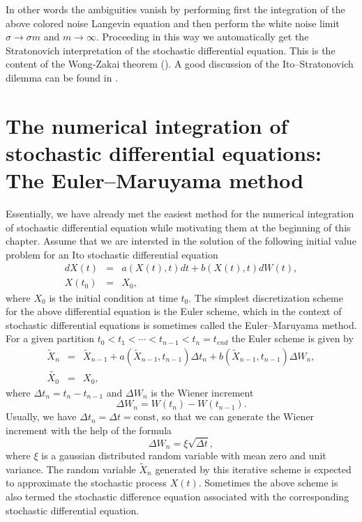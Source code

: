 In other words the ambiguities vanish by performing first the 
integration of the above colored noise Langevin equation and then 
perform the white noise limit $\sigma \rightarrow \sigma m$ and 
$m \rightarrow \infty$. Proceeding in this way we automatically 
get the Stratonovich interpretation of the stochastic differential 
equation. This is the content of the Wong-Zakai theorem 
(\cite{HORSTHEMKE}). A good discussion of the Ito--Stratonovich
dilemma can be found in \cite{VAN_KAMPEN}.



\section{The numerical integration of stochastic differential 
equations: The Euler--Maruyama method}
Essentially, we have already met the easiest method for the 
numerical integration of stochastic differential equation while 
motivating them at the beginning of this chapter.
Assume that we are intersted in the solution of the following
initial value problem for an Ito stochastic differential equation
\begin{eqnarray*}
dX(t) &=& a(X(t),t) dt + b(X(t),t) dW(t), \\
X(t_0) &=& X_0,
\end{eqnarray*}
where $X_0$ is the initial condition at time $t_0$. The simplest 
discretization scheme for the above differential equation
is the Euler scheme, which in the context of stochastic 
differential equations is sometimes called the Euler--Maruyama
method. For a given partition 
$t_0 < t_1 < \cdots < t_{n-1} < t_n=t_{end}$ 
the Euler scheme is given by
\begin{eqnarray*}
\tilde{X}_n &=& \tilde{X}_{n-1} +a (\tilde{X}_{n-1},t_{n-1}) \Delta 
t_n + b(\tilde{X}_{n-1},t_{n-1}) \Delta W_n, \\
\tilde{X_0} &=& X_0,
\end{eqnarray*}
where $\Delta t_n = t_n - t_{n-1}$ and $\Delta W_n$
is the Wiener increment
\begin{equation*}
\Delta W_n = W(t_n) - W(t_{n-1}).
\end{equation*}
Usually, we have $\Delta t_n = \Delta t = \text{const}$, so that
we can generate the Wiener increment with the help of the formula
\begin{equation*}
\Delta W_n = \xi \sqrt{\Delta t},
\end{equation*}
where $\xi$ is a gaussian distributed random variable with mean 
zero and unit variance. The random variable $\tilde{X}_n$ 
generated by this iterative scheme is expected to approximate the 
stochastic process $X(t)$. Sometimes the above scheme is also 
termed the stochastic difference equation associated with the 
corresponding stochastic differential equation.

